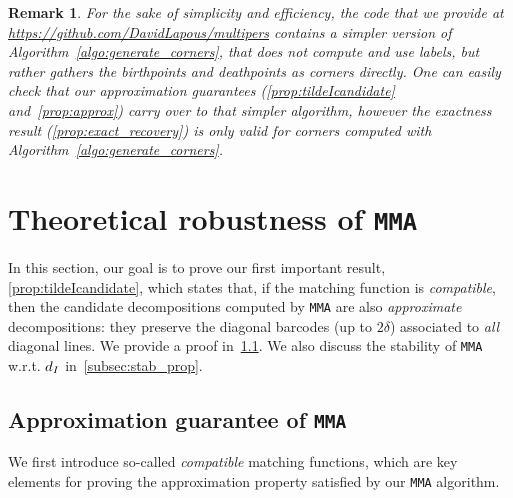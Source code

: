 \documentclass{article}
\newcommand{\disti}{{d_{\rm I}}}
\newcommand{\MMA}{\texttt{MMA}}
\newcommand{\mmaout}{candidate}
\newcommand{\mmaoutcompat}{approximate}
\newtheorem{remark}{Remark}%
\newcommand{\rebuttal}[1]{{ #1}}
\begin{document}
\begin{remark}
	For the sake of simplicity and efficiency, the code that we provide at
	\url{https://github.com/DavidLapous/multipers} contains a simpler version of
	Algorithm~\ref{algo:generate_corners}, that does not compute and use labels,
	but rather gathers the birthpoints and deathpoints as corners directly. One can easily check that our approximation guarantees %
	(\cref{prop:tildeIcandidate} and~\cref{prop:approx}) carry over to that
	simpler algorithm, however the exactness result (\cref{prop:exact_recovery}) is only valid for corners computed with Algorithm~\ref{algo:generate_corners}.  \\
\end{remark}



















\section{\rebuttal{Theoretical robustness of \MMA{}}}
\label{sec:approx}
\rebuttal{
In this section, our goal is to prove our first important result,
\cref{prop:tildeIcandidate}, which states that, if the matching function is {\em compatible}, then the \mmaout{} decompositions 
computed by \MMA{} are also {\em \mmaoutcompat{}} decompositions: they preserve the diagonal barcodes (up to $2\delta$) associated to {\em all} diagonal lines. We provide a proof in~\cref{subsec:approx_prop}. We also discuss the stability
of \MMA{} w.r.t. $\disti$ in~\cref{subsec:stab_prop}. %
}

\subsection{Approximation guarantee of \MMA{}}\label{subsec:approx_prop}

We first introduce so-called {\em compatible} matching functions, which are key elements for proving the approximation property satisfied by our \MMA{} algorithm. \\
\end{document}
